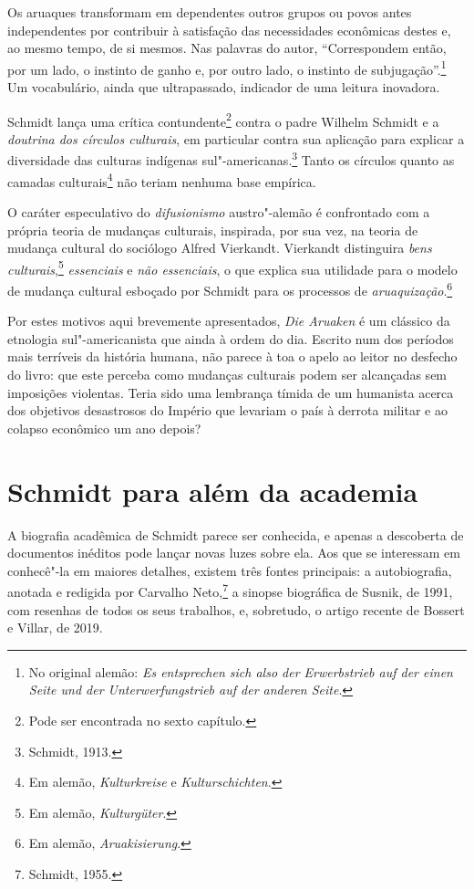 Os aruaques transformam em dependentes outros grupos ou povos antes independentes por contribuir à satisfação das necessidades econômicas destes e, ao mesmo tempo, de si mesmos. Nas palavras do autor, ``Correspondem então, por um lado, o instinto de ganho e, por outro lado, o instinto de subjugação''.\footnote{No original alemão: \textit{Es entsprechen sich also der Erwerbstrieb auf der einen Seite und der Unterwerfungstrieb auf der anderen Seite}.} Um vocabulário, ainda que ultrapassado, indicador de uma leitura inovadora.

Schmidt lança uma crítica contundente\footnote{Pode ser encontrada no sexto capítulo.} contra o padre Wilhelm Schmidt e a \textit{doutrina dos círculos culturais}, em particular contra sua aplicação para explicar a diversidade das culturas indígenas sul"-americanas.\footnote{Schmidt, 1913.} Tanto os círculos quanto as camadas culturais\footnote{Em alemão, \textit{Kulturkreise} e \textit{Kulturschichten}.} não teriam nenhuma base empírica. 

O caráter especulativo do \textit{difusionismo} austro"-alemão é confrontado com a própria teoria de mudanças culturais, inspirada, por sua vez, na teoria de mudança cultural do sociólogo Alfred Vierkandt. Vierkandt distinguira \textit{bens culturais},\footnote{Em alemão, \textit{Kulturgüter}.} \textit{essenciais} e \textit{não essenciais}, o que explica sua utilidade para o modelo de mudança cultural esboçado por Schmidt para os processos de \textit{aruaquização}.\footnote{Em alemão, \textit{Aruakisierung}.}

Por estes motivos aqui brevemente apresentados, \textit{Die Aruaken} é um clássico da etnologia sul"-americanista que ainda à ordem do dia. Escrito num dos períodos mais terríveis da história humana, não parece à toa o apelo ao leitor no desfecho do livro: que este perceba como mudanças culturais podem ser alcançadas sem imposições violentas. Teria sido uma lembrança tímida de um humanista acerca dos objetivos desastrosos do Império que levariam o país à derrota militar e ao colapso econômico um ano depois?

\section{Schmidt para além da academia}

A biografia acadêmica de Schmidt parece ser conhecida, e apenas a descoberta de documentos inéditos pode lançar novas luzes sobre ela. Aos que se interessam em conhecê"-la em maiores detalhes, existem três fontes principais: a autobiografia, anotada e redigida por Carvalho Neto,\footnote{Schmidt, 1955.} a sinopse biográfica de Susnik, de 1991, com resenhas de todos os seus trabalhos, e, sobretudo, o artigo recente de Bossert e Villar, de 2019. 

